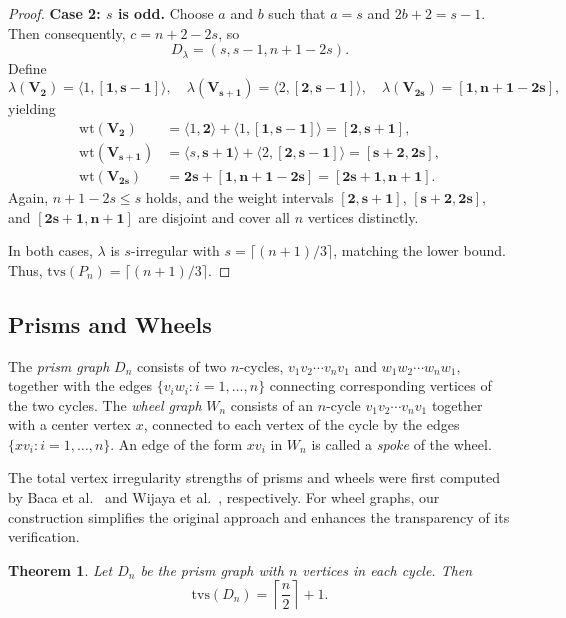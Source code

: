 \documentclass[11pt]{article}
\newtheorem{thm}{Theorem}[section]
\numberwithin{equation}{section}
\newcommand{\wt}{\mathrm{wt}}
\newcommand{\bv}[1]{\mathbf{#1}}
\begin{document}
\begin{proof}
\textbf{Case 2: \(s\) is odd.} Choose \(a\) and \(b\) such that \(a = s\) and \(2b + 2 = s - 1\). Then consequently, \(c  = n + 2 - 2s\), so
\[
D_{\lambda} = (s, s - 1, n + 1 - 2s).
\]
Define
\[
\lambda(\bv{V_2}) = \langle 1, \bv{[1,s-1]} \rangle, \quad \lambda(\bv{V_{s+1}}) = \langle 2, \bv{[2,s-1]} \rangle, \quad \lambda(\bv{V_{2s}}) = \bv{[1,n+1-2s]},
\]
yielding
\begin{align*}
\wt(\bv{V_2}) &= \langle 1, \bv{2} \rangle + \langle 1, \bv{[1,s-1]} \rangle = \bv{[2,s+1]}, \\
\wt(\bv{V_{s+1}}) &= \langle s, \bv{s+1} \rangle + \langle 2, \bv{[2,s-1]} \rangle = \bv{[s+2,2s]}, \\
\wt(\bv{V_{2s}}) &= \bv{2s} + \bv{[1,n+1-2s]} = \bv{[2s+1,n+1]}.
\end{align*}
Again, \(n + 1 - 2s \leq s\) holds, and the weight intervals \(\bv{[2,s+1]}\), \(\bv{[s+2,2s]}\), and \(\bv{[2s+1,n+1]}\) are disjoint and cover all \(n\) vertices distinctly.

In both cases, \(\lambda\) is \(s\)-irregular with \(s = \lceil (n + 1) / 3 \rceil\), matching the lower bound. Thus, \(\mathrm{tvs}(P_n) = \lceil (n + 1) / 3 \rceil\).
\end{proof}

\subsection{Prisms and Wheels}
 The \emph{prism graph} \(D_n\) consists of two \(n\)-cycles, \(v_1 v_2 \cdots v_n v_1\) and \(w_1 w_2 \cdots w_n w_1\), together with the edges \(\{v_i w_i : i = 1, \ldots, n\}\) connecting corresponding vertices of the two cycles. The \emph{wheel graph} \(W_n\) consists of an \(n\)-cycle \(v_1 v_2 \cdots v_n v_1\) together with a center vertex \(x\), connected to each vertex of the cycle by the edges \(\{x v_i : i = 1, \ldots, n\}\). An edge of the form \(x v_i\) in \(W_n\) is called a \emph{spoke} of the wheel.

The total vertex irregularity strengths of prisms and wheels were first computed by Baca et al.~\cite{bacaIrregularTotalLabellings2007} and Wijaya et al.~\cite{wijaya2008total}, respectively. For wheel graphs, our construction simplifies the original approach and enhances the transparency of its verification.

\begin{thm}\label{prism}
Let \(D_n\) be the prism graph with \(n\) vertices in each cycle. Then
\[
\mathrm{tvs}(D_n) = \left\lceil \frac{n}{2} \right\rceil + 1.
\]
\end{thm}
\end{document}
